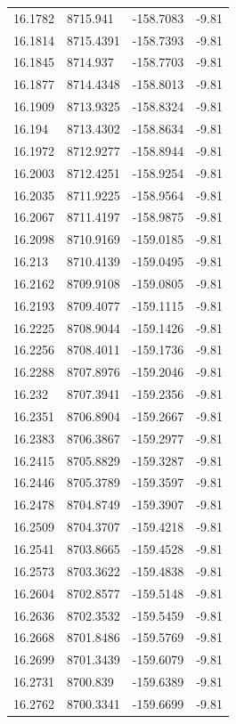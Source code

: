 \begin{table}[H]
\begin{tabular}{llll}
16.1782 & 8715.941 & -158.7083 & -9.81 \\
16.1814 & 8715.4391 & -158.7393 & -9.81 \\
16.1845 & 8714.937 & -158.7703 & -9.81 \\
16.1877 & 8714.4348 & -158.8013 & -9.81 \\
16.1909 & 8713.9325 & -158.8324 & -9.81 \\
16.194 & 8713.4302 & -158.8634 & -9.81 \\
16.1972 & 8712.9277 & -158.8944 & -9.81 \\
16.2003 & 8712.4251 & -158.9254 & -9.81 \\
16.2035 & 8711.9225 & -158.9564 & -9.81 \\
16.2067 & 8711.4197 & -158.9875 & -9.81 \\
16.2098 & 8710.9169 & -159.0185 & -9.81 \\
16.213 & 8710.4139 & -159.0495 & -9.81 \\
16.2162 & 8709.9108 & -159.0805 & -9.81 \\
16.2193 & 8709.4077 & -159.1115 & -9.81 \\
16.2225 & 8708.9044 & -159.1426 & -9.81 \\
16.2256 & 8708.4011 & -159.1736 & -9.81 \\
16.2288 & 8707.8976 & -159.2046 & -9.81 \\
16.232 & 8707.3941 & -159.2356 & -9.81 \\
16.2351 & 8706.8904 & -159.2667 & -9.81 \\
16.2383 & 8706.3867 & -159.2977 & -9.81 \\
16.2415 & 8705.8829 & -159.3287 & -9.81 \\
16.2446 & 8705.3789 & -159.3597 & -9.81 \\
16.2478 & 8704.8749 & -159.3907 & -9.81 \\
16.2509 & 8704.3707 & -159.4218 & -9.81 \\
16.2541 & 8703.8665 & -159.4528 & -9.81 \\
16.2573 & 8703.3622 & -159.4838 & -9.81 \\
16.2604 & 8702.8577 & -159.5148 & -9.81 \\
16.2636 & 8702.3532 & -159.5459 & -9.81 \\
16.2668 & 8701.8486 & -159.5769 & -9.81 \\
16.2699 & 8701.3439 & -159.6079 & -9.81 \\
16.2731 & 8700.839 & -159.6389 & -9.81 \\
16.2762 & 8700.3341 & -159.6699 & -9.81 \\

\end{tabular}
\end{table}
